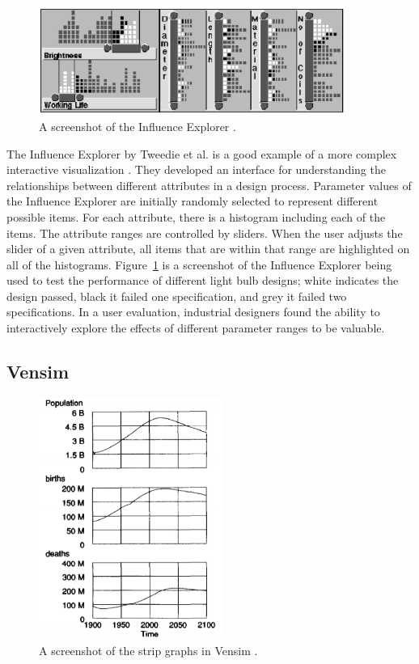 \begin{figure}[h]
	\centering
	\includegraphics[width=10cm]{figures/eps/influenceExplorer.eps}
	\caption{A screenshot of the Influence Explorer \cite{tweedie1995}.}
	\label{fig:influenceExplorer}
\end{figure}

The Influence Explorer by Tweedie et al. is a good example of a more complex interactive visualization \cite{tweedie1995}.  They developed an interface for understanding the relationships between different attributes in a design process.  Parameter values of the Influence Explorer are initially randomly selected to represent different possible items.  For each attribute, there is a histogram including each of the items.  The attribute ranges are controlled by sliders.  When the user adjusts the slider of a given attribute, all items that are within that range are highlighted on all of the histograms.  Figure~\ref{fig:influenceExplorer} is a screenshot of the Influence Explorer being used to test the performance of different light bulb designs; white indicates the design passed, black it failed one specification, and grey it failed two specifications.  In a user evaluation, industrial designers found the ability to interactively explore the effects of different parameter ranges to be valuable.

\subsection{Vensim}

\begin{figure}[h]
	\centering
	\includegraphics[width=6cm]{figures/eps/vensim.eps}
	\caption{A screenshot of the strip graphs in Vensim \cite{eberlein1992}.}
	\label{fig:vensim}
\end{figure}

